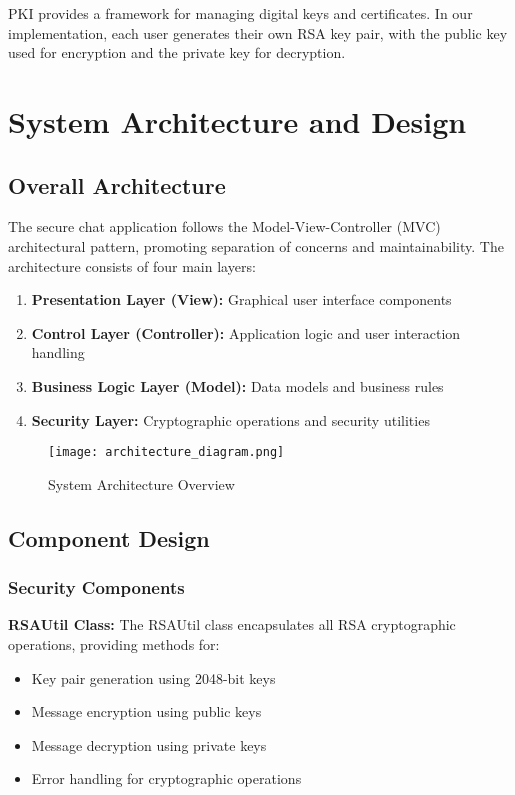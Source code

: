 \documentclass[12pt,a4paper]{article}
\begin{document}
PKI provides a framework for managing digital keys and certificates. In our implementation, each user generates their own RSA key pair, with the public key used for encryption and the private key for decryption.

\section{System Architecture and Design}

\subsection{Overall Architecture}

The secure chat application follows the Model-View-Controller (MVC) architectural pattern, promoting separation of concerns and maintainability. The architecture consists of four main layers:

\begin{enumerate}
    \item \textbf{Presentation Layer (View):} Graphical user interface components
    \item \textbf{Control Layer (Controller):} Application logic and user interaction handling
    \item \textbf{Business Logic Layer (Model):} Data models and business rules
    \item \textbf{Security Layer:} Cryptographic operations and security utilities
\end{enumerate}

\begin{figure}[H]
    \centering
    \texttt{[image: architecture\_diagram.png]}
    \caption{System Architecture Overview}
    \label{fig:architecture}
\end{figure}

\subsection{Component Design}

\subsubsection{Security Components}

\textbf{RSAUtil Class:}
The RSAUtil class encapsulates all RSA cryptographic operations, providing methods for:
\begin{itemize}
    \item Key pair generation using 2048-bit keys
    \item Message encryption using public keys
    \item Message decryption using private keys
    \item Error handling for cryptographic operations
\end{itemize}
\end{document}
